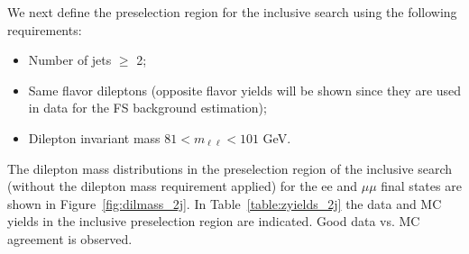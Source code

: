 \clearpage

We next define the preselection region for the inclusive search using the following requirements:
\begin{itemize}
\item Number of jets $\geq$ 2;
\item Same flavor dileptons (opposite flavor yields will be shown since they are used in data for the FS background estimation);
\item Dilepton invariant mass $81<m_{\ell\ell}<101$ GeV.
\end{itemize}

The dilepton mass distributions in the preselection region of the inclusive search (without the dilepton mass requirement applied) 
for the ee and $\mu\mu$ final states are shown in Figure~\ref{fig:dilmass_2j}. In Table~\ref{table:zyields_2j} the data and MC yields 
in the inclusive preselection region are indicated. Good data vs. MC agreement is observed.


